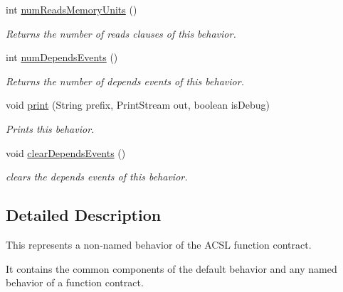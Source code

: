 \begin{DoxyCompactItemize}
int \hyperlink{interfaceedu_1_1udel_1_1cis_1_1vsl_1_1civl_1_1model_1_1IF_1_1contract_1_1FunctionBehavior_a9031ecbbc7776afc892c4440cba5e3ca}{num\+Reads\+Memory\+Units} ()
\begin{DoxyCompactList}\small\item\em Returns the number of reads clauses of this behavior. \end{DoxyCompactList}\item 
int \hyperlink{interfaceedu_1_1udel_1_1cis_1_1vsl_1_1civl_1_1model_1_1IF_1_1contract_1_1FunctionBehavior_a36115bc2ddad41d0073bbd84cf83569f}{num\+Depends\+Events} ()
\begin{DoxyCompactList}\small\item\em Returns the number of depends events of this behavior. \end{DoxyCompactList}\item 
void \hyperlink{interfaceedu_1_1udel_1_1cis_1_1vsl_1_1civl_1_1model_1_1IF_1_1contract_1_1FunctionBehavior_af898b35b9fa1723720214dabfbfdfd3e}{print} (String prefix, Print\+Stream out, boolean is\+Debug)
\begin{DoxyCompactList}\small\item\em Prints this behavior. \end{DoxyCompactList}\item 
\hypertarget{interfaceedu_1_1udel_1_1cis_1_1vsl_1_1civl_1_1model_1_1IF_1_1contract_1_1FunctionBehavior_adbd9db83467023c06096297d07d63cc0}{}void \hyperlink{interfaceedu_1_1udel_1_1cis_1_1vsl_1_1civl_1_1model_1_1IF_1_1contract_1_1FunctionBehavior_adbd9db83467023c06096297d07d63cc0}{clear\+Depends\+Events} ()\label{interfaceedu_1_1udel_1_1cis_1_1vsl_1_1civl_1_1model_1_1IF_1_1contract_1_1FunctionBehavior_adbd9db83467023c06096297d07d63cc0}

\begin{DoxyCompactList}\small\item\em clears the depends events of this behavior. \end{DoxyCompactList}\end{DoxyCompactItemize}


\subsection{Detailed Description}
This represents a non-\/named behavior of the A\+C\+S\+L function contract. 

It contains the common components of the default behavior and any named behavior of a function contract.

